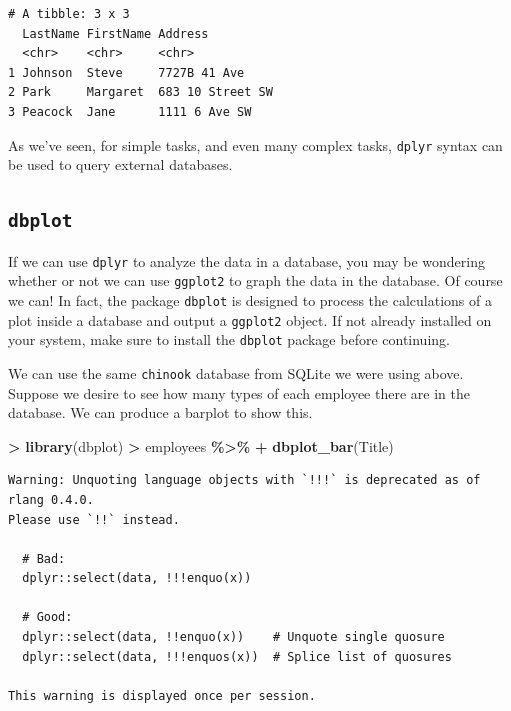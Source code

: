 \documentclass[
]{krantz}
\makeatletter
\newenvironment{Shaded}{\begin{snugshade}}{\end{snugshade}}
\newcommand{\KeywordTok}[1]{\textcolor[rgb]{0.27,0.27,0.27}{\textbf{#1}}}
\newcommand{\NormalTok}[1]{#1}
\newcommand{\OperatorTok}[1]{\textcolor[rgb]{0.43,0.43,0.43}{\textbf{#1}}}
\newcommand{\StringTok}[1]{\textcolor[rgb]{0.5,0.5,0.5}{#1}}
\newenvironment{kframe}{%
\medskip{}
\setlength{\fboxsep}{.8em}
 \def\at@end@of@kframe{}%
 \ifinner\ifhmode%
  \def\at@end@of@kframe{\end{minipage}}%
  \begin{minipage}{\columnwidth}%
 \fi\fi%
 \def\FrameCommand##1{\hskip\@totalleftmargin \hskip-\fboxsep
 \colorbox{shadecolor}{##1}\hskip-\fboxsep
     \hskip-\linewidth \hskip-\@totalleftmargin \hskip\columnwidth}%
 \MakeFramed {\advance\hsize-\width
   \@totalleftmargin\z@ \linewidth\hsize
   \@setminipage}}%
 {\par\unskip\endMakeFramed%
 \at@end@of@kframe}
\renewenvironment{Shaded}{\begin{kframe}}{\end{kframe}}
\makeatother
\begin{document}
\begin{verbatim}
# A tibble: 3 x 3
  LastName FirstName Address         
  <chr>    <chr>     <chr>           
1 Johnson  Steve     7727B 41 Ave    
2 Park     Margaret  683 10 Street SW
3 Peacock  Jane      1111 6 Ave SW   
\end{verbatim}

As we've seen, for simple tasks, and even many complex tasks, \texttt{dplyr} syntax can be used to query external databases.

\hypertarget{dbplot}{%
\subsection{\texorpdfstring{\texttt{dbplot}}{dbplot}}\label{dbplot}}

If we can use \texttt{dplyr} to analyze the data in a database, you may be wondering whether or not we can use \texttt{ggplot2} to graph the data in the database. Of course we can! In fact, the package \texttt{dbplot} is designed to process the calculations of a plot inside a database and output a \texttt{ggplot2} object. If not already installed on your system, make sure to install the \texttt{dbplot} package before continuing.

We can use the same \texttt{chinook} database from SQLite we were using above. Suppose we desire to see how many types of each employee there are in the database. We can produce a barplot to show this.

\begin{Shaded}
\begin{Highlighting}[]
\OperatorTok{\textgreater{}}\StringTok{ }\KeywordTok{library}\NormalTok{(dbplot)}
\OperatorTok{\textgreater{}}\StringTok{ }\NormalTok{employees }\OperatorTok{\%\textgreater{}\%}\StringTok{ }
\OperatorTok{+}\StringTok{   }\KeywordTok{dbplot\_bar}\NormalTok{(Title)}
\end{Highlighting}
\end{Shaded}

\begin{verbatim}
Warning: Unquoting language objects with `!!!` is deprecated as of rlang 0.4.0.
Please use `!!` instead.

  # Bad:
  dplyr::select(data, !!!enquo(x))

  # Good:
  dplyr::select(data, !!enquo(x))    # Unquote single quosure
  dplyr::select(data, !!!enquos(x))  # Splice list of quosures

This warning is displayed once per session.
\end{verbatim}
\end{document}
